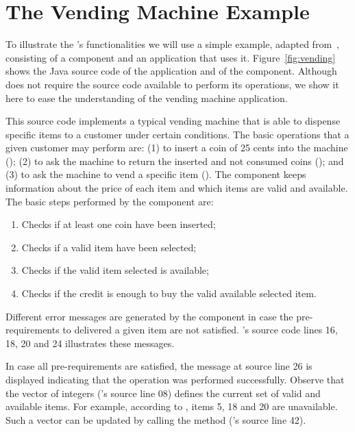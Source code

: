 
\section{The Vending Machine Example}\label{sec:example}

To illustrate the \toolname's functionalities we will use a simple
example, adapted from~\cite{Orso01UCMS}, consisting of a component
and an application that uses it. Figure~\ref{fig:vending} shows
the Java source code of the  application and of
the  component. Although \toolname does not require
the source code available to perform its operations, we show it
here to ease the understanding of the vending machine application.

This source code implements a typical vending machine that is able
to dispense specific items to a customer under certain conditions.
The basic operations that a given customer may perform are: (1) to
insert a coin of 25 cents into the machine
(); (2) to ask the machine to
return the inserted and not consumed coins
(); and (3) to ask the machine to
vend a specific item (). The
 component keeps information about the price of each
item and which items are valid and available. The basic steps
performed by the  component are:

\begin{enumerate}
    \item Checks if at least one coin have been inserted;
    \item Checks if a valid item have been selected;
    \item Checks if the valid item selected is available;
    \item Checks if the credit is enough to buy the valid
    available selected item.
\end{enumerate}

Different error messages are generated by the 
component in case the pre-requirements to delivered a given item
are not satisfied. 's source code lines 16, 18, 20
and 24 illustrates these messages.

In case all pre-requirements are satisfied, the message at source
line 26 is displayed indicating that the operation was performed
successfully. Observe that the vector of integers
 ('s source line 08) defines
the current set of valid and available items. For example,
according to , items 5, 18 and 20 are
unavailable. Such a vector can be updated by calling the
 method ('s source
line 42).


